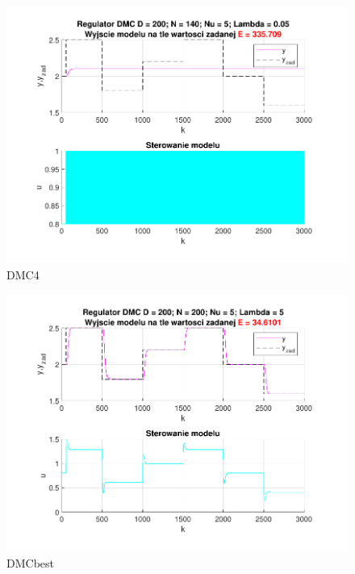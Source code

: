 \begin{figure}[H]
    \centering
    \includegraphics[scale=0.90]{../projekt/zad4_5/DMC_pdf/DMC_4.pdf}
    \caption{DMC4}
\end{figure}


\begin{figure}[H]
    \centering
    \includegraphics[scale=0.90]{../projekt/zad4_5/DMC_pdf/DMC_best.pdf}
    \caption{DMCbest}
\end{figure}


